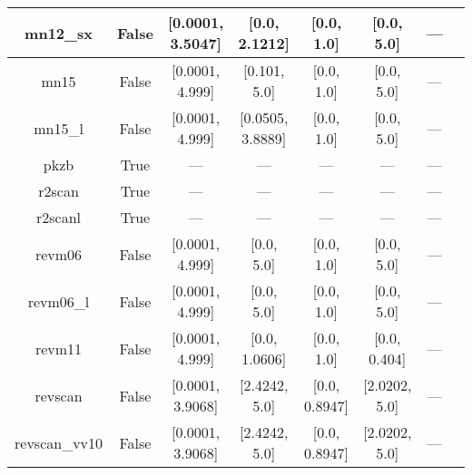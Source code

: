 \begin{tabular}{|c|c|c|c|c|c|c|l|}
     mn12\_sx &                 False & [0.0001, 3.5047] &    [0.0, 2.1212] &    [0.0, 1.0] &     [0.0, 5.0] &        --- &                                                          \cite{Peverati2012_16187} \\ \hline
         mn15 &                 False &  [0.0001, 4.999] &     [0.101, 5.0] &    [0.0, 1.0] &     [0.0, 5.0] &        --- &                                                                 \cite{Yu2016_5032} \\ \hline
      mn15\_l &                 False &  [0.0001, 4.999] & [0.0505, 3.8889] &    [0.0, 1.0] &     [0.0, 5.0] &        --- &                                                                 \cite{Yu2016_1280} \\ \hline
         pkzb &                  True &              --- &              --- &           --- &            --- &        --- &                                                             \cite{Perdew1999_2544} \\ \hline
       r2scan &                  True &              --- &              --- &           --- &            --- &        --- &                                           \cite{Furness2020_8208,Furness2020_9248} \\ \hline
      r2scanl &                  True &              --- &              --- &           --- &            --- &        --- &                          \cite{Mejia2020_121109,Furness2020_8208,Furness2020_9248} \\ \hline
       revm06 &                 False &  [0.0001, 4.999] &       [0.0, 5.0] &    [0.0, 1.0] &     [0.0, 5.0] &        --- &                                                              \cite{Wang2018_10257} \\ \hline
    revm06\_l &                 False &  [0.0001, 4.999] &       [0.0, 5.0] &    [0.0, 1.0] &     [0.0, 5.0] &        --- &                                                               \cite{Wang2017_8487} \\ \hline
       revm11 &                 False &  [0.0001, 4.999] &    [0.0, 1.0606] &    [0.0, 1.0] &   [0.0, 0.404] &        --- &                                                              \cite{Verma2019_2966} \\ \hline
      revscan &                 False & [0.0001, 3.9068] &    [2.4242, 5.0] & [0.0, 0.8947] &  [2.0202, 5.0] &        --- &                                                              \cite{Mezei2018_2469} \\ \hline
revscan\_vv10 &                 False & [0.0001, 3.9068] &    [2.4242, 5.0] & [0.0, 0.8947] &  [2.0202, 5.0] &        --- &                                                              \cite{Mezei2018_2469} \\ \hline

\end{tabular}
